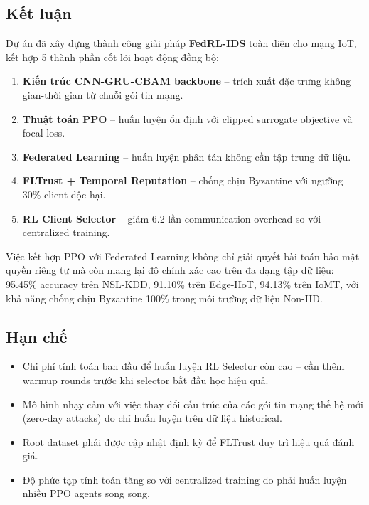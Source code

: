 \documentclass[12pt,a4paper]{article}
\begin{document}
\subsection{Kết luận}
Dự án đã xây dựng thành công giải pháp \textbf{FedRL-IDS} toàn diện cho mạng IoT, kết hợp 5 thành phần cốt lõi hoạt động đồng bộ:
\begin{enumerate}
    \item \textbf{Kiến trúc CNN-GRU-CBAM backbone} -- trích xuất đặc trưng không gian-thời gian từ chuỗi gói tin mạng.
    \item \textbf{Thuật toán PPO} -- huấn luyện ổn định với clipped surrogate objective và focal loss.
    \item \textbf{Federated Learning} -- huấn luyện phân tán không cần tập trung dữ liệu.
    \item \textbf{FLTrust + Temporal Reputation} -- chống chịu Byzantine với ngưỡng 30\% client độc hại.
    \item \textbf{RL Client Selector} -- giảm 6.2 lần communication overhead so với centralized training.
\end{enumerate}
Việc kết hợp PPO với Federated Learning không chỉ giải quyết bài toán bảo mật quyền riêng tư mà còn mang lại độ chính xác cao trên đa dạng tập dữ liệu: 95.45\% accuracy trên NSL-KDD, 91.10\% trên Edge-IIoT, 94.13\% trên IoMT, với khả năng chống chịu Byzantine 100\% trong môi trường dữ liệu Non-IID.

\subsection{Hạn chế}
\begin{itemize}
    \item Chi phí tính toán ban đầu để huấn luyện RL Selector còn cao -- cần thêm warmup rounds trước khi selector bắt đầu học hiệu quả.
    \item Mô hình nhạy cảm với việc thay đổi cấu trúc của các gói tin mạng thế hệ mới (zero-day attacks) do chỉ huấn luyện trên dữ liệu historical.
    \item Root dataset phải được cập nhật định kỳ để FLTrust duy trì hiệu quả đánh giá.
    \item Độ phức tạp tính toán tăng so với centralized training do phải huấn luyện nhiều PPO agents song song.
\end{itemize}
\end{document}

